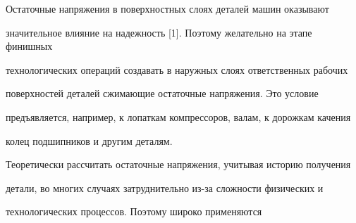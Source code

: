 











\date{13/I/2009}





\maketitle







Остаточные напряжения в поверхностных слоях деталей машин оказывают

значительное влияние на надежность [1]. Поэтому желательно на этапе финишных

технологических операций создавать в наружных слоях ответственных рабочих

поверхностей деталей сжимающие остаточные напряжения. Это условие

предъявляется, например, к лопаткам компрессоров, валам, к дорожкам качения

колец подшипников и другим деталям.



Теоретически рассчитать остаточные напряжения, учитывая историю получения

детали, во многих случаях затруднительно из-за сложности физических и

технологических процессов. Поэтому широко применяются

